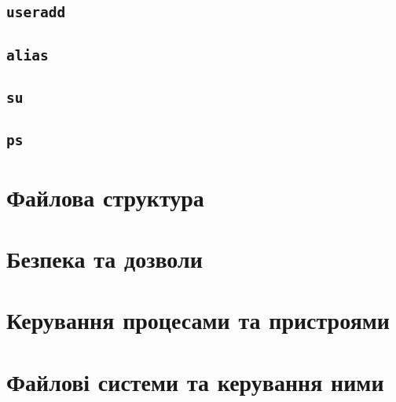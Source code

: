 \documentclass[10pt,a4paper]{fancyhandout}
\begin{document}
\subsection{\texttt{useradd}}
\goodbreak

\subsection{\texttt{alias}}
\goodbreak

\subsection{\texttt{su}}
\goodbreak

\subsection{\texttt{ps}}
\goodbreak


\section{Файлова структура}
\section{Безпека та дозволи} \label{Безпека та дозволи}
\section{Керування процесами та пристроями}
\section{Файлові системи та керування ними}
\tableofcontents
\doclicenseThis
\end{document}

